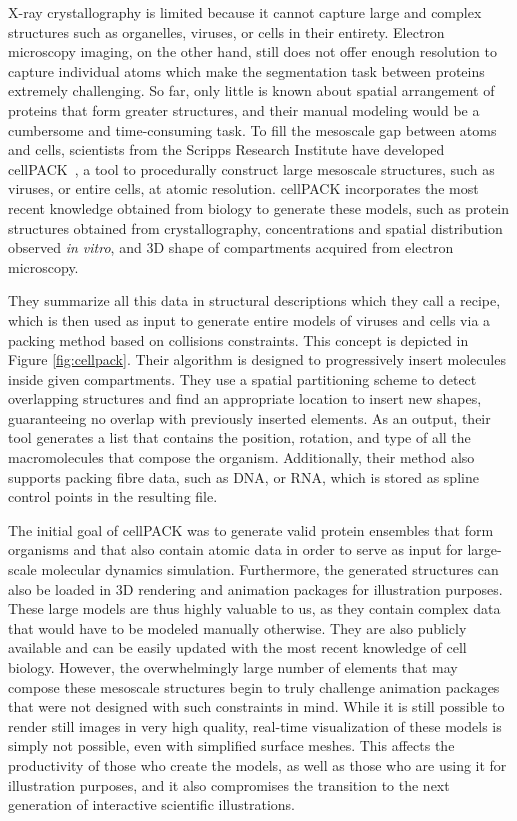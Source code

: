 X-ray crystallography is limited because it cannot capture large and complex structures such as organelles, viruses, or cells in their entirety.
Electron microscopy imaging, on the other hand, still does not offer enough resolution to capture individual atoms which make the segmentation task between proteins extremely challenging.
So far, only little is known about spatial arrangement of proteins that form greater structures, and their manual modeling would be a cumbersome and time-consuming task.
To fill the mesoscale gap between atoms and cells, scientists from the Scripps Research Institute have developed cellPACK~\cite{johnson2015cellpack}, a tool to procedurally construct large mesoscale structures, such as viruses, or entire cells, at atomic resolution.
cellPACK incorporates the most recent knowledge obtained from biology to generate these models, such as protein structures obtained from crystallography, concentrations and spatial distribution observed \textit{in vitro}, and 3D shape of compartments acquired from electron microscopy.

They summarize all this data in structural descriptions which they call a recipe, which is then used as input to generate entire models of viruses and cells via a packing method based on collisions constraints. 
This concept is depicted in Figure \ref{fig:cellpack}.
Their algorithm is designed to progressively insert molecules inside given compartments.
They use a spatial partitioning scheme to detect overlapping structures and find an appropriate location to insert new shapes, guaranteeing no overlap with previously inserted elements.
As an output, their tool generates a list that contains the position, rotation, and type of all the macromolecules that compose the organism.
Additionally, their method also supports packing fibre data, such as DNA, or RNA, which is stored as spline control points in the resulting file.

The initial goal of cellPACK was to generate valid protein ensembles that form organisms and that also contain atomic data in order to serve as input for large-scale molecular dynamics simulation.
Furthermore, the generated structures can also be loaded in 3D rendering and animation packages for illustration purposes.
These large models are thus highly valuable to us, as they contain complex data that would have to be modeled manually otherwise.
They are also publicly available and can be easily updated with the most recent knowledge of cell biology.
However, the overwhelmingly large number of elements that may compose these mesoscale structures begin to truly challenge animation packages that were not designed with such constraints in mind.
While it is still possible to render still images in very high quality, real-time visualization of these models is simply not possible, even with simplified surface meshes. 
This affects the productivity of those who create the models, as well as those who are using it for illustration purposes, and it also compromises the transition to the next generation of interactive scientific illustrations.

